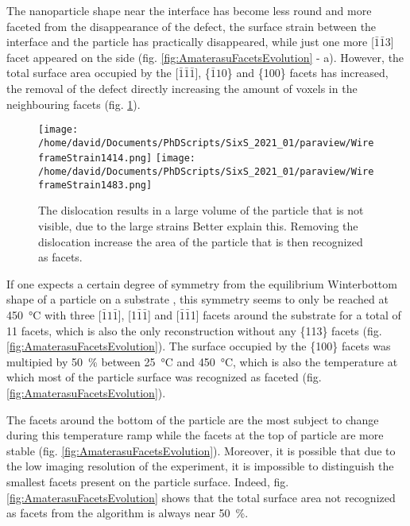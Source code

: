 The nanoparticle shape near the interface has become less round and more faceted from the disappearance of the defect, the surface strain between the interface and the particle has practically disappeared, while just one more [$\bar{1}\bar{1}3$] facet appeared on the side (fig. \ref{fig:AmaterasuFacetsEvolution} - a).
However, the total surface area occupied by the [$\bar{1}\bar{1}\bar{1}$], \{$\bar{1}10$\} and \{100\} facets has increased, the removal of the defect directly increasing the amount of voxels in the neighbouring facets (fig. \ref{fig:AmaterasuDefect}).

\begin{figure}[!htb]
    \centering
    \texttt{[image: /home/david/Documents/PhDScripts/SixS\_2021\_01/paraview/WireframeStrain1414.png]}
    \texttt{[image: /home/david/Documents/PhDScripts/SixS\_2021\_01/paraview/WireframeStrain1483.png]}
    \caption{
        The dislocation results in a large volume of the particle that is not visible, due to the large strains \textcolor{Important}{Better explain this}.
        Removing the dislocation increase the area of the particle that is then recognized as facets.
    }
    \label{fig:AmaterasuDefect}
\end{figure}

If one expects a certain degree of symmetry from the equilibrium Winterbottom shape of a particle on a substrate \parencite{WINTERBOTTOM1967, Boukouvala2021}, this symmetry seems to only be reached at \qty{450}{\degreeCelsius} with three [$\bar{1}1\bar{1}$], [1$\bar{1}\bar{1}$] and [$\bar{1}\bar{1}$1] facets around the substrate for a total of 11 facets, which is also the only reconstruction without any \{113\} facets (fig. \ref{fig:AmaterasuFacetsEvolution}).
The surface occupied by the \{100\} facets was multipied by \qty{50}{\percent} between \qty{25}{\degreeCelsius} and \qty{450}{\degreeCelsius}, which is also the temperature at which most of the particle surface was recognized as faceted (fig. \ref{fig:AmaterasuFacetsEvolution}).

The facets around the bottom of the particle are the most subject to change during this temperature ramp while the facets at the top of particle are more stable (fig. \ref{fig:AmaterasuFacetsEvolution}).
Moreover, it is possible that due to the low imaging resolution of the experiment, it is impossible to distinguish the smallest facets present on the particle surface.
Indeed, fig. \ref{fig:AmaterasuFacetsEvolution} shows that the total surface area not recognized as facets from the algorithm is always near \qty{50}{\percent}.

